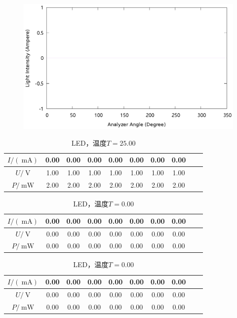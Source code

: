 \documentclass{ctexart}
\newcommand{\si}[1]{\  \mathrm{#1}}
\begin{document}
    \begin{figure}[H]
        \centering
        \includegraphics[width=\linewidth]{../output/analyzer-angle-light-intensity-16.gnuplot}
    \end{figure}
    \newpage
    \begin{table}[H]
        \centering
        \begin{tabular}{|c|c|c|c|c|c|c|c|c|c|}
            \hline
            $I/(\si{mA})$ & 0.00 & 0.00 & 0.00 & 0.00 & 0.00 & 0.00 & 0.00 \\\hline
            $U / \si{V}$  & 1.00 & 1.00 & 1.00 & 1.00 & 1.00 & 1.00 & 1.00 \\\hline
            $P / \si{mW}$ & 2.00 & 2.00 & 2.00 & 2.00 & 2.00 & 2.00 & 2.00 \\\hline
        \end{tabular}
        \caption{LED，温度$T=25.00$}
    \end{table}
    \newpage
    \begin{table}[H]
        \centering
        \begin{tabular}{|c|c|c|c|c|c|c|c|c|c|}
            \hline
            $I/(\si{mA})$ & 0.00 & 0.00 & 0.00 & 0.00 & 0.00 & 0.00 & 0.00 \\\hline
            $U / \si{V}$  & 0.00 & 0.00 & 0.00 & 0.00 & 0.00 & 0.00 & 0.00 \\\hline
            $P / \si{mW}$ & 0.00 & 0.00 & 0.00 & 0.00 & 0.00 & 0.00 & 0.00 \\\hline
        \end{tabular}
        \caption{LED，温度$T=0.00$}
    \end{table}
    \newpage
    \begin{table}[H]
        \centering
        \begin{tabular}{|c|c|c|c|c|c|c|c|c|c|}
            \hline
            $I/(\si{mA})$ & 0.00 & 0.00 & 0.00 & 0.00 & 0.00 & 0.00 & 0.00 \\\hline
            $U / \si{V}$  & 0.00 & 0.00 & 0.00 & 0.00 & 0.00 & 0.00 & 0.00 \\\hline
            $P / \si{mW}$ & 0.00 & 0.00 & 0.00 & 0.00 & 0.00 & 0.00 & 0.00 \\\hline
        \end{tabular}
        \caption{LED，温度$T=0.00$}
    \end{table}
\end{document}
